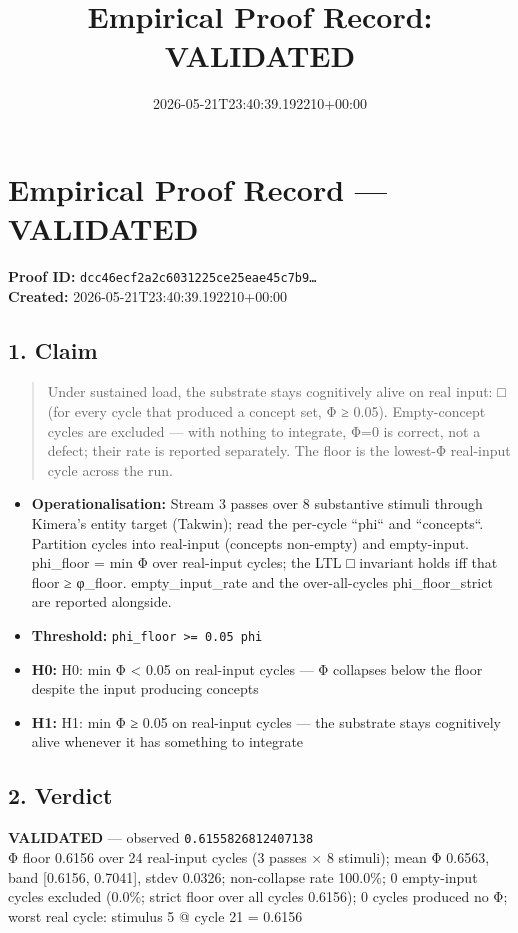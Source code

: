 \documentclass{article}
\title{Empirical Proof Record: VALIDATED}
\date{2026-05-21T23:40:39.192210+00:00}
\begin{document}
\maketitle
\section*{Empirical Proof Record --- \textcolor{validated}{\textbf{VALIDATED}}}
\textbf{Proof ID:} \texttt{dcc46ecf2a2c6031225ce25eae45c7b9\dots}\\
\textbf{Created:} 2026-05-21T23:40:39.192210+00:00
\subsection*{1. Claim}
\begin{quote}Under sustained load, the substrate stays cognitively alive on real input: □ (for every cycle that produced a concept set, Φ ≥ 0.05). Empty-concept cycles are excluded — with nothing to integrate, Φ=0 is correct, not a defect; their rate is reported separately. The floor is the lowest-Φ real-input cycle across the run.\end{quote}
\begin{itemize}
\item \textbf{Operationalisation:} Stream 3 passes over 8 substantive stimuli through Kimera's entity target (Takwin); read the per-cycle ``phi`` and ``concepts``. Partition cycles into real-input (concepts non-empty) and empty-input. phi\_floor = min Φ over real-input cycles; the LTL □ invariant holds iff that floor ≥ φ\_floor. empty\_input\_rate and the over-all-cycles phi\_floor\_strict are reported alongside.
\item \textbf{Threshold:} \texttt{phi\_floor >= 0.05 phi}
\item \textbf{H0:} H0: min Φ < 0.05 on real-input cycles — Φ collapses below the floor despite the input producing concepts
\item \textbf{H1:} H1: min Φ ≥ 0.05 on real-input cycles — the substrate stays cognitively alive whenever it has something to integrate
\end{itemize}
\subsection*{2. Verdict}
\textcolor{validated}{\textbf{VALIDATED}} --- observed \texttt{0.6155826812407138}\\
Φ floor 0.6156 over 24 real-input cycles (3 passes × 8 stimuli); mean Φ 0.6563, band [0.6156, 0.7041], stdev 0.0326; non-collapse rate 100.0\%; 0 empty-input cycles excluded (0.0\%; strict floor over all cycles 0.6156); 0 cycles produced no Φ; worst real cycle: stimulus 5 @ cycle 21 = 0.6156
\end{document}
